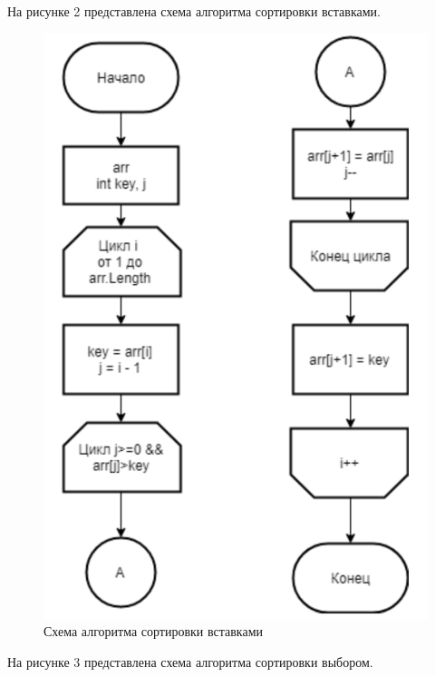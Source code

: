 \documentclass[a4paper,12pt]{article}
\begin{document}
	На рисунке 2 представлена схема алгоритма сортировки вставками.
	\begin{figure}[H]
		\centering
		\includegraphics{insert.png}
		\captionsetup{justification=centering}
		\caption{Схема алгоритма сортировки вставками}
		\label{Рис 2}
	\end{figure}
	На рисунке 3 представлена схема алгоритма сортировки выбором.
\end{document}
